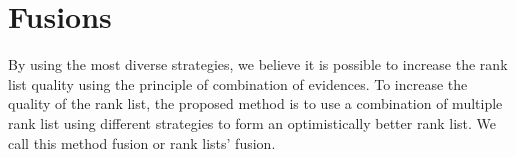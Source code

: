 \chapter{Fusions \label{sec:fusions}}

By using the most diverse strategies, we believe it is possible to increase the rank list quality using the principle of combination of evidences.
To increase the quality of the rank list, the proposed method is to use a combination of multiple rank list using different strategies to form an optimistically better rank list.
We call this method fusion or rank lists' fusion.





